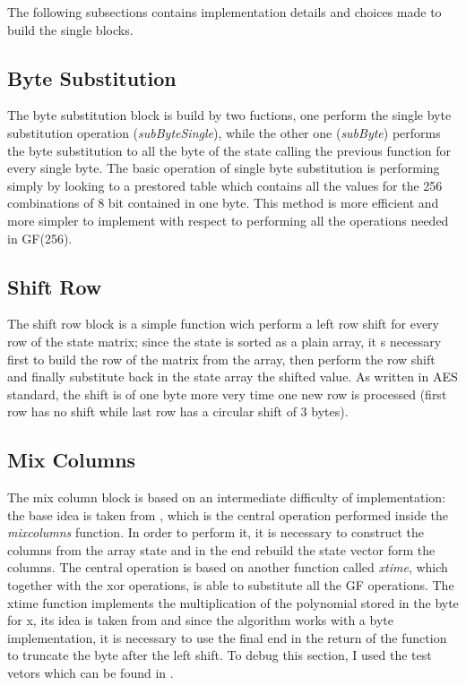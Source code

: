 \documentclass{article}
\begin{document}
The following subsections contains implementation details and choices made to build the single blocks.

\subsection{Byte Substitution}

The byte substitution block is build by two fuctions, one perform the single byte substitution operation (\textit {subByteSingle}), while the other one (\textit {subByte}) performs the byte substitution to all the byte of the state calling the previous function for every single byte. The basic operation of single byte substitution is performing simply by looking to a prestored table which contains all the values for the 256 combinations of 8 bit contained in one byte. This method is more efficient and more simpler to implement with respect to performing all the operations needed in GF(256).

\subsection{Shift Row}

The shift row block is a simple function wich perform a left row shift for every row of the state matrix; since the state is sorted as a plain array, it s necessary first to build the row of the matrix from the array, then perform the row shift and finally substitute back in the state array the shifted value. As written in AES standard, the shift is of one byte more very time one new row is processed (first row has no shift while last row has a circular shift of 3 bytes). 

\subsection{Mix Columns}

The mix column block is based on an intermediate difficulty of implementation: the base idea is taken from \cite{10.5555/560131}, which is the central operation performed inside the \textit{mixcolumns} function. In order to perform it, it is necessary to construct the columns from the array state and in the end rebuild the state vector form the columns. The central operation is based on another function called \textit{xtime}, which together with the xor operations, is able to substitute all the GF operations. The xtime function implements the multiplication of the polynomial stored in the byte for x, its idea is taken from \cite{AESxtime} and since the algorithm works with a byte implementation, it is necessary to use the final end in the return of the function to truncate the byte after the left shift. \newline
To debug this section, I used the test vetors which can be found in \cite{AESmixcolumn}.
\end{document}
